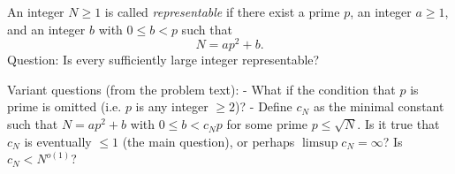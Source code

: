 An integer $N\ge 1$ is called \emph{representable} if there exist a prime $p$, an integer $a\ge 1$, and an integer $b$ with $0\le b<p$ such that
\[
 N=ap^2+b.
\]
Question: Is every sufficiently large integer representable?

Variant questions (from the problem text):
- What if the condition that $p$ is prime is omitted (i.e. $p$ is any integer $\ge 2$)?
- Define $c_N$ as the minimal constant such that $N=ap^2+b$ with $0\le b<c_N p$ for some prime $p\le\sqrt N$. Is it true that $c_N$ is eventually $\le 1$ (the main question), or perhaps $\limsup c_N=\infty$? Is $c_N<N^{o(1)}$?
